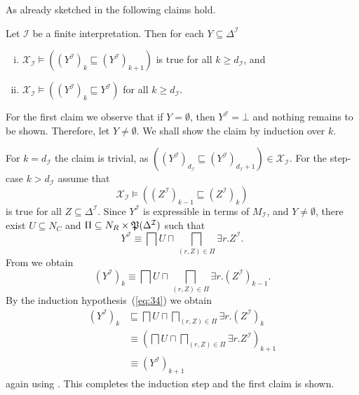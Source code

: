 As already sketched in  the following claims hold.

\begin{Lemma}
  \label{lem:X_I-properties}
  Let $\mathcal{I}$ be a finite interpretation.  Then for each $Y \subseteq
  \Delta^{\mathcal{I}}$
  \begin{enumerate}[i. ]
  \item $\mathcal{X}_{\mathcal{I}} \models ((Y^{\mathcal{I}})_k \sqsubseteq
    (Y^{\mathcal{I}})_{k+1})$ is true for all $k \geq d_{\mathcal{I}}$, and
  \item $\mathcal{X}_{\mathcal{I}} \models ((Y^{\mathcal{I}})_{k} \sqsubseteq
    Y^{\mathcal{I}})$ for all $k \geq d_{\mathcal{I}}$.
  \end{enumerate}
\end{Lemma}
\begin{Proof}
  For the first claim we observe that if $Y = \emptyset$, then $Y^{\mathcal{I}} = \bot$
  and nothing remains to be shown.  Therefore, let $Y \neq \emptyset$.  We shall show the
  claim by induction over $k$.

  For $k = d_{\mathcal{I}}$ the claim is trivial, as $((Y^{\mathcal{I}})_{d_{\mathcal{I}}}
  \sqsubseteq (Y^{\mathcal{I}})_{d_{\mathcal{I}}+1}) \in \mathcal{X}_{\mathcal{I}}$.  For
  the step-case $k > d_{\mathcal{I}}$ assume that
  \begin{equation}
    \label{eq:34}
    \mathcal{X}_{\mathcal{I}} \models ((Z^{\mathcal{I}})_{k-1} \sqsubseteq (Z^{\mathcal{I}})_k)
  \end{equation}
  is true for all $Z \subseteq \Delta^{\mathcal{I}}$.  Since $Y^{\mathcal{I}}$ is
  expressible in terms of $M_{\mathcal{I}}$, and $Y \neq \emptyset$, there exist $U
  \subseteq N_C$ and $\Pi \subseteq N_R \times {\ensuremath{\mathfrak{P}(\Delta^{\mathcal{I}})}}$ such that
  \begin{equation*}
    Y^{\mathcal{I}} \equiv \bigsqcap U \sqcap \bigsqcap_{(r, Z) \in \Pi} \exists r. Z^{\mathcal{I}}.
  \end{equation*}
  From  we obtain
  \begin{equation*}
    (Y^{\mathcal{I}})_k \equiv \bigsqcap U \sqcap \bigsqcap_{(r, Z) \in \Pi} \exists r.(Z^{\mathcal{I}})_{k-1}.
  \end{equation*}
  By the induction hypothesis~(\ref{eq:34}) we obtain
  \begin{align*}
    (Y^{\mathcal{I}})_k
    &\sqsubseteq \bigsqcap U \sqcap \bigsqcap_{(r, Z) \in \Pi} \exists
    r. (Z^{\mathcal{I}})_k\\
    &\equiv (\bigsqcap U \sqcap \bigsqcap_{(r, Z) \in \Pi} \exists
    r. Z^{\mathcal{I}})_{k+1} \\
    &\equiv (Y^{\mathcal{I}})_{k+1}
  \end{align*}
  again using .  This completes the induction step
  and the first claim is shown.


\end{Proof}
